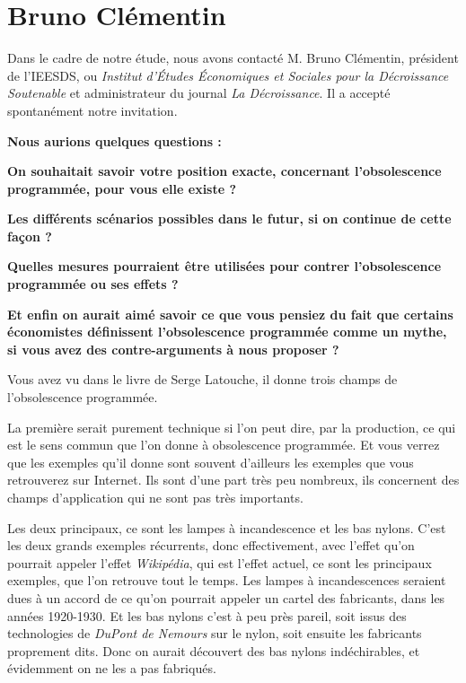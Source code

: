 \section{Bruno Clémentin}
\label{InterviewBClémentin}

Dans le cadre de notre étude, nous avons contacté M. Bruno Clémentin, président de l'IEESDS, ou \textit{Institut d’Études Économiques et Sociales pour la Décroissance Soutenable} et administrateur du journal \textit{La Décroissance}. Il a accepté spontanément notre invitation.

\vspace{2\baselineskip}

\begin{small}

\textbf{Nous aurions quelques questions : }

\textbf{On souhaitait savoir votre position exacte, concernant l’obsolescence programmée, pour vous elle existe ?}

\textbf{Les différents scénarios possibles dans le futur, si on continue de cette façon ?}

\textbf{Quelles mesures pourraient être utilisées pour contrer l’obsolescence programmée ou ses effets ?}

\textbf{Et enfin on aurait aimé savoir ce que vous pensiez du fait que certains économistes définissent l’obsolescence programmée comme un mythe, si vous avez des contre-arguments à nous proposer ?}

\vspace{1\baselineskip}

Vous avez vu dans le livre de Serge Latouche, il donne trois champs de l'obsolescence programmée.
 
La première serait purement technique si l'on peut dire, par la production, ce qui est le sens commun que l'on donne à obsolescence programmée. Et vous verrez que les exemples qu'il donne sont souvent d'ailleurs les exemples que vous retrouverez sur Internet. Ils sont d'une part très peu nombreux, ils concernent des champs d'application qui ne sont pas très importants.
 
Les deux principaux, ce sont les lampes à incandescence et les bas nylons. C'est les deux grands exemples récurrents, donc effectivement, avec l'effet qu'on pourrait appeler l'effet \textit{Wikipédia}, qui est l'effet actuel, ce sont les principaux exemples, que l'on retrouve tout le temps.
Les lampes à incandescences seraient dues à un accord de ce qu'on pourrait appeler un cartel des fabricants, dans les années 1920-1930.
Et les bas nylons c'est à peu près pareil, soit issus des technologies de \textit{DuPont de Nemours} sur le nylon, soit ensuite les fabricants proprement dits. Donc on aurait découvert des bas nylons indéchirables, et évidemment on ne les a pas fabriqués.


\end{small}
